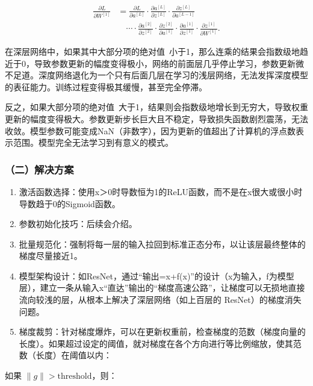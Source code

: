 \[
\begin{aligned}
\frac{\partial L}{\partial W^{[1]}}
&=
\frac{\partial L}{\partial a^{[L]}}
\cdot
\frac{\partial a^{[L]}}{\partial z^{[L]}}
\cdot
\frac{\partial z^{[L]}}{\partial a^{[L-1]}} \\
&\quad \cdots
\cdot
\frac{\partial a^{[2]}}{\partial z^{[2]}}
\cdot
\frac{\partial z^{[2]}}{\partial a^{[1]}}
\cdot
\frac{\partial a^{[1]}}{\partial z^{[1]}}
\cdot
\frac{\partial z^{[1]}}{\partial W^{[1]}} .
\end{aligned}
\]

在深层网络中，如果其中大部分项的绝对值~小于1，那么连乘的结果会指数级地趋近于0，导致参数更新的幅度变得极小，网络的前面层几乎停止学习，参数更新微不足道。深度网络退化为一个只有后面几层在学习的浅层网络，无法发挥深度模型的表征能力。训练过程变得极其缓慢，甚至完全停滞。

反之，如果大部分项的绝对值~大于1，结果则会指数级地增长到无穷大，导致权重更新的幅度变得极大。参数更新步长巨大且不稳定，导致损失函数剧烈震荡，无法收敛。模型参数可能变成NaN（非数字），因为更新的值超出了计算机的浮点数表示范围。模型完全无法学习到有意义的模式。

\hypertarget{ux4e8cux89e3ux51b3ux65b9ux6848}{%
\subsubsection{（二）解决方案}\label{ux4e8cux89e3ux51b3ux65b9ux6848}}

\begin{enumerate}
\def\labelenumi{\arabic{enumi}.}
\item
  激活函数选择：使用x＞0时导数恒为1的ReLU函数，而不是在x很大或很小时导数趋于0的Sigmoid函数。
\item
  参数初始化技巧：后续会介绍。
\item
  批量规范化：强制将每一层的输入拉回到标准正态分布，以让该层最终整体的梯度尽量接近1。
\item
  模型架构设计：如ResNet，通过``输出=x+f(x)''的设计（x为输入，f为模型层），建立一条从输入x``直达''输出的``梯度高速公路''，让梯度可以无损地直接流向较浅的层，从根本上解决了深层网络（如上百层的 ResNet）的梯度消失问题。
\item
{}
  梯度裁剪：针对梯度爆炸，可以在更新权重前，检查梯度的范数（梯度向量的长度）。如果超过设定的阈值，就对梯度在各个方向进行等比例缩放，使其范数（长度）在阈值以内：
\end{enumerate}

如果 \(\lVert g\rVert > \text{threshold}\)，则：


